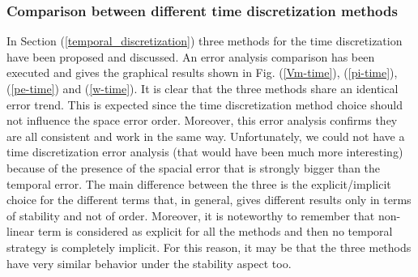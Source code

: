 \documentclass[a4paper,11pt]{article}
\begin{document}
\subsubsection{Comparison between different time discretization methods}
In Section (\ref{temporal_discretization}) three methods for the time discretization have been proposed and discussed. An error analysis comparison has been executed and gives the graphical results shown in Fig. (\ref{Vm-time}), (\ref{pi-time}),  (\ref{pe-time}) and (\ref{w-time}).
\noindent It is clear that the three methods share an identical error trend. This is expected since the time discretization method choice should not influence the space error order. Moreover, this error analysis confirms they are all consistent and work in the same way. Unfortunately, we could not have a time discretization error analysis (that would have been much more interesting) because of the presence of the spacial error that is strongly bigger than the temporal error. The main difference between the three is the explicit/implicit choice for the different terms that, in general, gives different results only in terms of stability and not of order. Moreover, it is noteworthy to remember that non-linear term is considered as explicit for all the methods and then no temporal strategy is completely implicit. For this reason, it may be that the three methods have very similar behavior under the stability aspect too.
\end{document}
